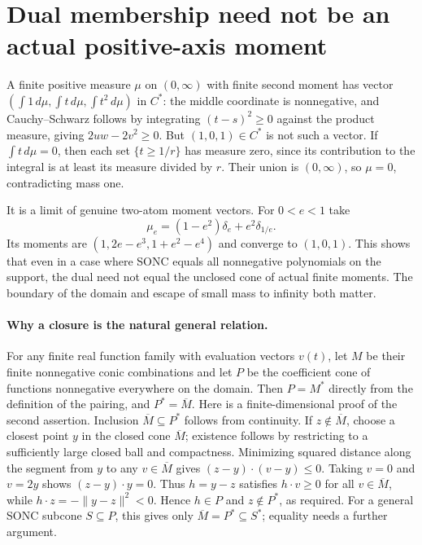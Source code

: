 \documentclass[11pt]{article}
\begin{document}
\section{Dual membership need not be an actual positive-axis moment}
A finite positive measure $\mu$ on $(0,\infty)$ with finite second moment
has vector $(\int1\,d\mu,\int t\,d\mu,\int t^2\,d\mu)$ in $C^*$:
the middle coordinate is nonnegative, and Cauchy--Schwarz follows by
integrating $(t-s)^2\ge0$ against the product measure, giving
$2uw-2v^2\ge0$. But $(1,0,1)\in C^*$ is not such a vector.
If $\int t\,d\mu=0$, then each set $\{t\ge1/r\}$ has measure zero,
since its contribution to the integral is at least its measure divided
by $r$. Their union is $(0,\infty)$, so $\mu=0$, contradicting mass one.

It is a limit of genuine two-atom moment vectors. For $0<e<1$ take
\[
\mu_e=(1-e^2)\delta_e+e^2\delta_{1/e}.
\]
Its moments are $(1,2e-e^3,1+e^2-e^4)$ and converge to $(1,0,1)$.
This shows that even in a case where SONC equals all nonnegative
polynomials on the support, the dual need not equal the unclosed cone
of actual finite moments. The boundary of the domain and escape of
small mass to infinity both matter.

\paragraph{Why a closure is the natural general relation.}
For any finite real function family with evaluation vectors $v(t)$,
let $M$ be their finite nonnegative conic combinations and let $P$
be the coefficient cone of functions nonnegative everywhere on the
domain. Then $P=M^*$ directly from the definition of the pairing,
and $P^*=\overline M$. Here is a finite-dimensional proof of the
second assertion. Inclusion $\overline M\subseteq P^*$ follows from
continuity. If $z\notin\overline M$, choose a closest point $y$ in
the closed cone $\overline M$; existence follows by restricting to
a sufficiently large closed ball and compactness. Minimizing squared
distance along the segment from $y$ to any $v\in\overline M$ gives
$(z-y)\cdot(v-y)\le0$. Taking $v=0$ and $v=2y$ shows
$(z-y)\cdot y=0$. Thus $h=y-z$ satisfies
$h\cdot v\ge0$ for all $v\in\overline M$, while
$h\cdot z=-\|y-z\|^2<0$. Hence $h\in P$ and $z\notin P^*$,
as required. For a general SONC subcone $S\subseteq P$, this gives
only $\overline M=P^*\subseteq S^*$; equality needs a further argument.
\end{document}
